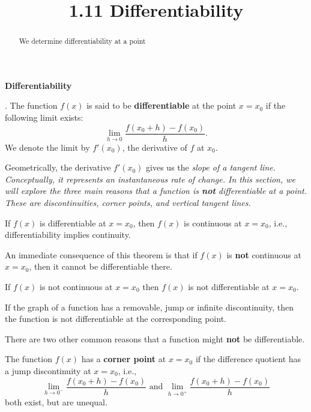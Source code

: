 \documentclass{ximera}
\title{1.11 Differentiability}
\begin{document}
\begin{abstract}
We determine differentiability at a point
\end{abstract}

\maketitle

\begin{center}
\textbf{Differentiability}
\end{center}


\begin{definition}[Differentiability].  The function $f(x)$ is said to be 
\textbf{differentiable} at the point $x= x_0$
if the following limit exists:
\[
\lim_{h\to 0} \frac{f(x_0+h) -f(x_0)}{h}.
\]
We denote the limit by $f'(x_0)$, the derivative of $f$ at $x_0$.

\end{definition}

Geometrically, the derivative $f'(x_0)$ gives us the \it{slope} of a tangent line.  
Conceptually, it represents an \it{instantaneous} rate of change.
In this section, we will explore the three main reasons that a function is \textbf{not} differentiable at a point. These are
discontinuities, corner points, and vertical tangent lines.

\begin{theorem}
If $f(x)$ is differentiable at $x = x_0$, then $f(x)$ is continuous at $x=x_0$, i.e.,
differentiability implies continuity.
\end{theorem}

An immediate consequence of this theorem is that if $f(x)$ is \textbf{not} continuous at $x = x_0$,
then it cannot be differentiable there.  

\begin{corollary}
If $f(x)$ is not continuous at $x = x_0$ then $f(x)$ is not differentiable at $x = x_0$.
\end{corollary}

If the graph of a function has a removable, jump or infinite discontinuity, 
then the function is not differentiable at the corresponding point.

There are two other common reasons that a function might \textbf{not} be differentiable.

\begin{definition} The function $f(x)$ has a \textbf{corner point} at $x = x_0$ if
the difference quotient has a jump discontinuity at $x = x_0$, i.e.,
\[
\lim_{h\to 0^-} \frac{f(x_0 +h)-f(x_0)}{h} \text{  and  }  \lim_{h\to 0^+} \frac{f(x_0 +h)-f(x_0)}{h}
\]
both exist, but are unequal.

\end{definition}
\end{document}

